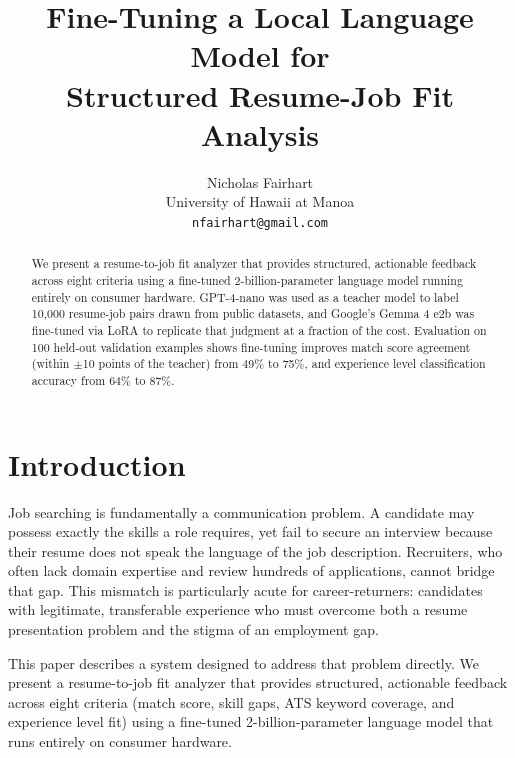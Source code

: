 \documentclass[10pt,twocolumn,letterpaper]{article}
\begin{document}
\title{Fine-Tuning a Local Language Model for\\Structured Resume-Job Fit Analysis}

\author{Nicholas Fairhart\\
University of Hawaii at Manoa\\
{\tt\small nfairhart@gmail.com}
}

\maketitle

\begin{abstract}
We present a resume-to-job fit analyzer that provides structured, actionable feedback across eight criteria using a fine-tuned 2-billion-parameter language model running entirely on consumer hardware. GPT-4-nano was used as a teacher model to label 10,000 resume-job pairs drawn from public datasets, and Google's Gemma 4 e2b was fine-tuned via LoRA to replicate that judgment at a fraction of the cost. Evaluation on 100 held-out validation examples shows fine-tuning improves match score agreement (within $\pm$10 points of the teacher) from 49\% to 75\%, and experience level classification accuracy from 64\% to 87\%.
\end{abstract}

\section{Introduction}

Job searching is fundamentally a communication problem. A candidate may possess exactly the skills a role requires, yet fail to secure an interview because their resume does not speak the language of the job description. Recruiters, who often lack domain expertise and review hundreds of applications, cannot bridge that gap. This mismatch is particularly acute for career-returners: candidates with legitimate, transferable experience who must overcome both a resume presentation problem and the stigma of an employment gap.

This paper describes a system designed to address that problem directly. We present a resume-to-job fit analyzer that provides structured, actionable feedback across eight criteria (match score, skill gaps, ATS keyword coverage, and experience level fit) using a fine-tuned 2-billion-parameter language model that runs entirely on consumer hardware.
\end{document}
